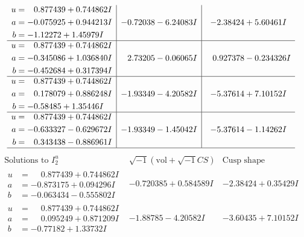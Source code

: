 \documentclass[1p]{elsarticle_modified}
\theoremstyle{definition}
\newcommand{\I}{\sqrt{-1}}
\begin{document}
$$\begin{array}{c|c|c}
\begin{aligned}
u &= \phantom{-}0.877439 + 0.744862 I \\
a &= -0.075925 + 0.944213 I \\
b &= -1.12272 + 1.45979 I\end{aligned}
 & -0.72038 - 6.24083 I & -2.38424 + 5.60461 I \\ \hline\begin{aligned}
u &= \phantom{-}0.877439 + 0.744862 I \\
a &= -0.345086 + 1.036840 I \\
b &= -0.452684 + 0.317394 I\end{aligned}
 & \phantom{-}2.73205 - 0.06065 I & \phantom{-}0.927378 - 0.234326 I \\ \hline\begin{aligned}
u &= \phantom{-}0.877439 + 0.744862 I \\
a &= \phantom{-}0.178079 + 0.886248 I \\
b &= -0.58485 + 1.35446 I\end{aligned}
 & -1.93349 - 4.20582 I & -5.37614 + 7.10152 I \\ \hline\begin{aligned}
u &= \phantom{-}0.877439 + 0.744862 I \\
a &= -0.633327 - 0.629672 I \\
b &= \phantom{-}0.343438 - 0.886961 I\end{aligned}
 & -1.93349 - 1.45042 I & -5.37614 - 1.14262 I\\
 \hline 
 \end{array}$$\newpage$$\begin{array}{c|c|c}  
\text{Solutions to }I^u_{2}& \I (\text{vol} + \sqrt{-1}CS) & \text{Cusp shape}\\
 \hline 
\begin{aligned}
u &= \phantom{-}0.877439 + 0.744862 I \\
a &= -0.873175 + 0.094296 I \\
b &= -0.063434 - 0.555802 I\end{aligned}
 & -0.720385 + 0.584589 I & -2.38424 + 0.35429 I \\ \hline\begin{aligned}
u &= \phantom{-}0.877439 + 0.744862 I \\
a &= \phantom{-}0.095249 + 0.871209 I \\
b &= -0.77182 + 1.33732 I\end{aligned}
 & -1.88785 - 4.20582 I & -3.60435 + 7.10152 I \\ \hline\begin{aligned}

\end{aligned}
\end{array}$$
\end{document}
